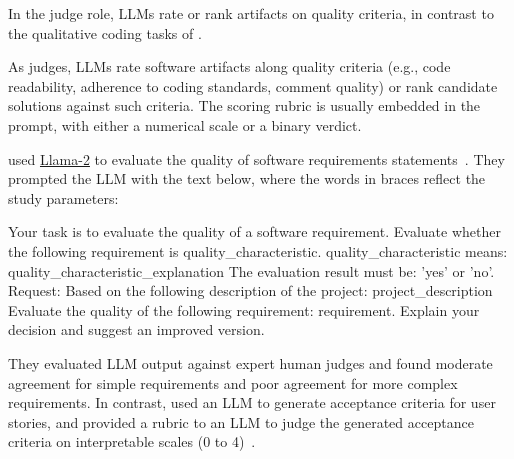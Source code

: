 \label{sec:llms-as-judges}

In the judge role, LLMs rate or rank artifacts on quality criteria, in contrast to the qualitative coding tasks of \annotators.


As judges, LLMs rate software artifacts along quality criteria (e.g., code readability, adherence to coding standards, comment quality) or rank candidate solutions against such criteria. The scoring rubric is usually embedded in the prompt, with either a numerical scale or a binary verdict.


\citeauthor{DBLP:conf/re/LubosFTGMEL24} used \href{https://www.llama.com/llama2/}{Llama-2} to evaluate the quality of software requirements statements~\cite{DBLP:conf/re/LubosFTGMEL24}.
They prompted the LLM with the text below, where the words in braces reflect the study parameters:

\begin{plain}
Your task is to evaluate the quality of a software requirement.
Evaluate whether the following requirement is {quality_characteristic}.
{quality_characteristic} means: {quality_characteristic_explanation}
The evaluation result must be: 'yes' or 'no'.
Request: Based on the following description of the project: {project_description}
Evaluate the quality of the following requirement: {requirement}.
Explain your decision and suggest an improved version.
\end{plain}

They evaluated LLM output against expert human judges and found moderate agreement for simple requirements and poor agreement for more complex requirements. In contrast, \citeauthor{DBLP:conf/kbse/WangALHTASL25} used an LLM to generate acceptance criteria for user stories, and provided a rubric to an LLM to judge the generated acceptance criteria on interpretable scales (0 to 4)~\cite{DBLP:conf/kbse/WangALHTASL25}.
